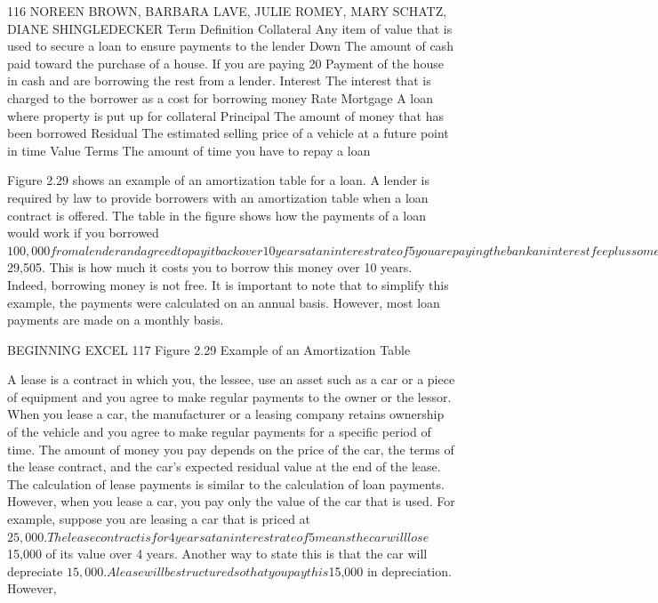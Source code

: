 116 NOREEN BROWN, BARBARA LAVE, JULIE ROMEY, MARY SCHATZ, DIANE SHINGLEDECKER
Term        Definition
Collateral Any item of value that is used to secure a loan to ensure payments to the lender
Down        The amount of cash paid toward the purchase of a house. If you are paying 20%
Payment     of the house in cash and are borrowing the rest from a lender.
Interest
The interest that is charged to the borrower as a cost for borrowing money
Rate
Mortgage A loan where property is put up for collateral
Principal   The amount of money that has been borrowed
Residual
The estimated selling price of a vehicle at a future point in time
Value
Terms       The amount of time you have to repay a loan


Figure 2.29 shows an example of an amortization table for a loan. A lender is required by law to
provide borrowers with an amortization table when a loan contract is offered. The table in the figure
shows how the payments of a loan would work if you borrowed $100,000 from a lender and agreed to
pay it back over 10 years at an interest rate of 5%
you are paying the bank an interest fee plus some of the loan principal. Each year the amount of
interest paid to the bank decreases and the amount of money used to pay off the principal increases.
This is because the bank is charging you interest on the amount of principal that has not been paid. As
you pay off the principal, the interest rate is applied to a lower number, which reduces your interest
charges. Finally, the figure shows that the sum of the values in the Interest Payment column is $29,505.
This is how much it costs you to borrow this money over 10 years. Indeed, borrowing money is not
free. It is important to note that to simplify this example, the payments were calculated on an annual
basis. However, most loan payments are made on a monthly basis.




BEGINNING EXCEL 117
Figure 2.29 Example of an Amortization Table


A lease is a contract in which you, the lessee, use an asset such as a car or a piece of equipment and you
agree to make regular payments to the owner or the lessor. When you lease a car, the manufacturer
or a leasing company retains ownership of the vehicle and you agree to make regular payments for a
specific period of time. The amount of money you pay depends on the price of the car, the terms of
the lease contract, and the car’s expected residual value at the end of the lease. The calculation of lease
payments is similar to the calculation of loan payments. However, when you lease a car, you pay only
the value of the car that is used. For example, suppose you are leasing a car that is priced at $25,000.
The lease contract is for 4 years at an interest rate of 5%
means the car will lose $15,000 of its value over 4 years. Another way to state this is that the car will
depreciate $15,000. A lease will be structured so that you pay this $15,000 in depreciation. However,

